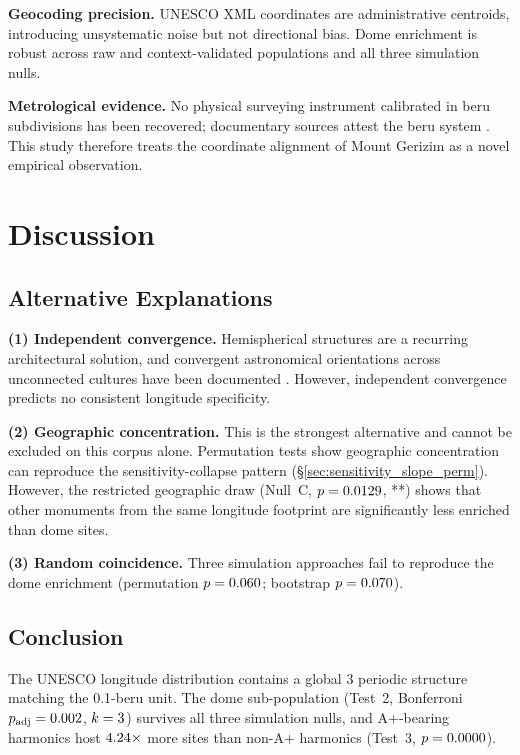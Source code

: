 \documentclass[HARVARD,twocolumn]{USG}
\begin{document}
\textbf{Geocoding precision.}
UNESCO XML coordinates are administrative centroids, introducing
unsystematic noise but not directional bias. Dome enrichment is robust
across raw and context-validated populations and all three simulation nulls.

\textbf{Metrological evidence.}
No physical surveying instrument calibrated in beru subdivisions has been 
recovered; documentary sources attest the beru 
system \citep{hunger2019mul,robson2008mathematics,powell1987metrological}.
This study therefore treats the coordinate alignment of Mount Gerizim as
a novel empirical observation.

\section{Discussion}
\label{sec:discussion}

\subsection{Alternative Explanations}
\label{sec:alt_explanations}

\textbf{(1) Independent convergence.}
Hemispherical structures are a recurring architectural solution, and
convergent astronomical orientations across unconnected cultures have
been documented \citep{aveni2001skywatchers,aveni2003archaeoastronomy}. However,
independent convergence predicts no consistent longitude specificity.

\textbf{(2) Geographic concentration.}
This is the strongest alternative and cannot be excluded on this corpus
alone. Permutation tests show geographic concentration can reproduce the
sensitivity-collapse pattern (\S\ref{sec:sensitivity_slope_perm}).
However, the restricted geographic draw (Null~C,
$p = 0.0129$, **) shows that other monuments from the
same longitude footprint are significantly less enriched than dome sites.

\textbf{(3) Random coincidence.}
Three simulation approaches fail to reproduce the dome enrichment
(permutation $p = 0.060$; bootstrap $p = 0.070$).

\subsection{Conclusion}

The UNESCO longitude distribution contains a global 3\textdegree{} periodic
structure matching the 0.1-beru unit. The dome sub-population (Test~2,
Bonferroni $p_\mathrm{adj} = 0.002$, $k = 3$) survives all three
simulation nulls, and A+-bearing harmonics host
$4.24\times$ more sites than non-A+ harmonics (Test~3,
$p = 0.0000$).
\end{document}
